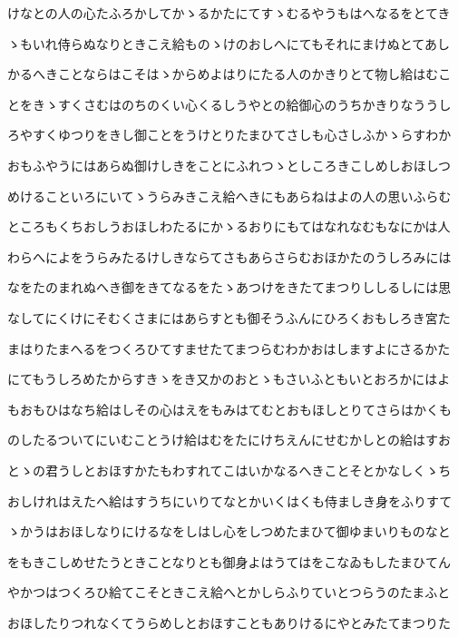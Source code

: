 \documentclass[a4paper,11pt,landscape]{ltjtarticle}
\begin{document}
\par\medskip
けなとの人の心たふろかしてかゝるかたにてすゝむるやうもはへなるをとてき
\par\medskip
ゝもいれ侍らぬなりときこえ給ものゝけのおしへにてもそれにまけぬとてあし
\par\medskip
かるへきことならはこそはゝからめよはりにたる人のかきりとて物し給はむこ
\par\medskip
とをきゝすくさむはのちのくい心くるしうやとの給御心のうちかきりなううし
\par\medskip
ろやすくゆつりをきし御ことをうけとりたまひてさしも心さしふかゝらすわか
\par\medskip
おもふやうにはあらぬ御けしきをことにふれつゝとしころきこしめしおほしつ
\par\medskip
めけることいろにいてゝうらみきこえ給へきにもあらねはよの人の思いふらむ
\par\medskip
ところもくちおしうおほしわたるにかゝるおりにもてはなれなむもなにかは人
\par\medskip
わらへによをうらみたるけしきならてさもあらさらむおほかたのうしろみには
\par\medskip
なをたのまれぬへき御をきてなるをたゝあつけをきたてまつりししるしには思
\par\medskip
なしてにくけにそむくさまにはあらすとも御そうふんにひろくおもしろき宮た
\par\medskip
まはりたまへるをつくろひてすませたてまつらむわかおはしますよにさるかた
\par\medskip
にてもうしろめたからすきゝをき又かのおとゝもさいふともいとおろかにはよ
\par\medskip
もおもひはなち給はしその心はえをもみはてむとおもほしとりてさらはかくも
\par\medskip
のしたるついてにいむことうけ給はむをたにけちえんにせむかしとの給はすお
\par\medskip
とゝの君うしとおほすかたもわすれてこはいかなるへきことそとかなしくゝち
\par\medskip
おしけれはえたへ給はすうちにいりてなとかいくはくも侍ましき身をふりすて
\par\medskip
ゝかうはおほしなりにけるなをしはし心をしつめたまひて御ゆまいりものなと
\par\medskip
をもきこしめせたうときことなりとも御身よはうてはをこなゐもしたまひてん
\par\medskip
やかつはつくろひ給てこそときこえ給へとかしらふりていとつらうのたまふと
\par\medskip
おほしたりつれなくてうらめしとおほすこともありけるにやとみたてまつりた
\end{document}
